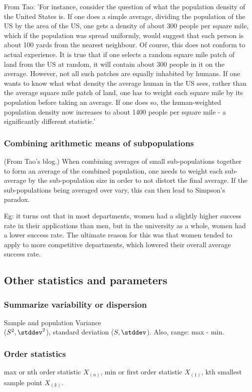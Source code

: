 \documentclass[oneside, article]{memoir}
\begin{document}
From Tao: 'For instance, consider the question of what the population density of the United States is. If one does a simple average, dividing the population of the US by the area of the US, one gets a density of about 300 people per square mile, which if the population was spread uniformly, would suggest that each person is about 100 yards from the nearest neighbour. Of course, this does not conform to actual experience. It is true that if one selects a random square mile patch of land from the US at random, it will contain about 300 people in it on the average. However, not all such patches are equally inhabited by humans. If one wants to know what what density the average human in the US sees, rather than the average square mile patch of land, one has to weight each square mile by its population before taking an average. If one does so, the human-weighted population density now increases to about 1400 people per square mile - a significantly different statistic.'

\subsubsection{Combining arithmetic means of subpopulations}
(From Tao's blog.) When combining averages of small sub-populations together to form an average of the combined population, one needs to weight each sub-average by the sub-population size in order to not distort the final average. If the sub-populations being averaged over vary, this can then lead to Simpson's paradox.

Eg: it turns out that in most departments, women had a slightly higher success rate in their applications than men, but in the university as a whole, women had a lower success rate. The ultimate reason for this was that women tended to apply to more competitive departments, which lowered their overall average success rate. 

\subsection{Other statistics and parameters}
\subsubsection{Summarize variability or dispersion}
Sample and population Variance \\
($S^{2}, \stddev^{2}$), standard deviation ($S, \stddev$). Also, range: max - min.

\subsubsection{Order statistics}
max or nth order statistic $X_{(n)}$, min or first order statistic $X_{(1)}$, kth smallest sample point $X_{(k)}$.
\end{document}
